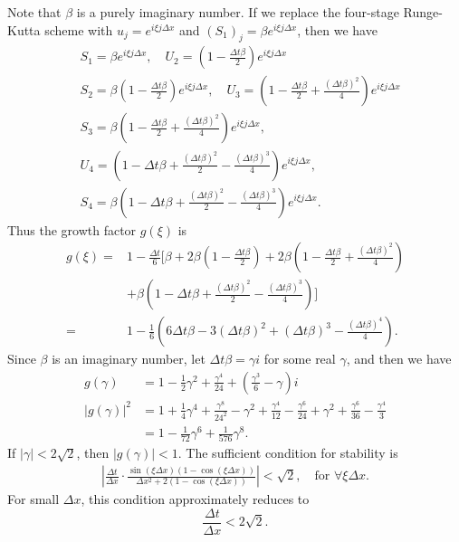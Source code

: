 \documentclass[review]{elsarticle}
\begin{document}
Note that $\beta$ is a purely imaginary number.
If we replace the four-stage Runge-Kutta scheme with
$u_j= e^{i\xi j \Delta x}$ and  $(S_1)_j= \beta e^{i\xi j \Delta x}$, then we have
\begin{align*}
&S_1 = \beta e^{i\xi j \Delta x} ,
 \quad U_2 = \left(1-\frac{\Delta t\beta}{2} \right) e^{i\xi j \Delta x}\\
&S_2 = \beta \left(1-\frac{\Delta t\beta}{2} \right) e^{i\xi j \Delta x} ,
 \quad U_3 = \left(1- \frac{\Delta t\beta}{2}+\frac{(\Delta t\beta)^2}{4} \right) e^{i\xi j \Delta x}\\
&S_3 =  \beta\left(1- \frac{\Delta t\beta}{2}+\frac{(\Delta t\beta)^2}{4} \right)  e^{i\xi j \Delta x} , \\
& U_4 = \left(1-\Delta t\beta
+ \frac{(\Delta t\beta)^2}{2}-\frac{(\Delta t\beta)^3}{4} \right) e^{i\xi j \Delta x},\\
&S_4 = \beta \left(1-\Delta t\beta
+ \frac{(\Delta t\beta)^2}{2}-\frac{(\Delta t\beta)^3}{4} \right) e^{i\xi j \Delta x}.
\end{align*}
Thus the growth factor $g(\xi)$ is
\begin{align*}
g(\xi)= & 1-\frac{\Delta t}{6}\bigg[ \beta + 
2 \beta \left(1-\frac{\Delta t\beta}{2} \right) +
2 \beta\left(1- \frac{\Delta t\beta}{2}+\frac{(\Delta t\beta)^2}{4} \right) \\ 
&+ \beta \left(1-\Delta t\beta
+ \frac{(\Delta t\beta)^2}{2}-\frac{(\Delta t\beta)^3}{4} \right)
\bigg] \\
= & 1-\frac{1}{6}\left(
6\Delta t\beta -3(\Delta t\beta)^2 +(\Delta t\beta)^3-\frac{(\Delta t\beta)^4}{4}
\right).
\end{align*}
Since $\beta$ is an imaginary number,
let $\Delta t\beta= \gamma i$ for some real $\gamma$, and then we have
\begin{align*}
g(\gamma) & = 1-
\frac{1}{2}\gamma^2 +\frac{\gamma^4}{24} + \left(\frac{\gamma^3}{6} -\gamma \right)i \\
|g(\gamma)|^2 & = 1 + \frac{1}{4}\gamma^4 + \frac{\gamma^8}{24^2} -\gamma^2 + \frac{\gamma^4}{12}
-\frac{\gamma^6}{24} + \gamma^2 + \frac{\gamma^6}{36} -\frac{\gamma^4}{3} \\
& = 1 -\frac{1}{72}\gamma^6 + \frac{1}{576}\gamma^8.
\end{align*}
If $|\gamma|<2\sqrt{2}$, then $|g(\gamma)|<1$. 
The sufficient condition for stability is 
\begin{align}
\left| \frac{\Delta t}{\Delta x} \cdot \frac{ \sin(\xi \Delta x)(1-  \cos(\xi \Delta x)) }
                     { \Delta x^2 +2(1-\cos(\xi \Delta x))} \right| < \sqrt{2}, 
                     \quad \textrm{for~} \forall \xi \Delta x.
\end{align}
For small $\Delta x$, this condition approximately reduces to
\[
\frac{\Delta t}{\Delta x} < 2\sqrt{2}.
\]
\end{document}
